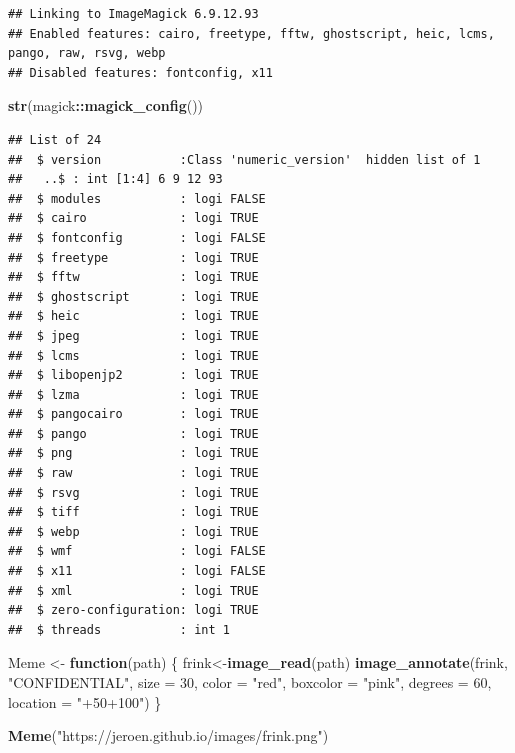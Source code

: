 \documentclass[
]{article}
\newenvironment{Shaded}{\begin{snugshade}}{\end{snugshade}}
\newcommand{\AttributeTok}[1]{\textcolor[rgb]{0.13,0.29,0.53}{#1}}
\newcommand{\ControlFlowTok}[1]{\textcolor[rgb]{0.13,0.29,0.53}{\textbf{#1}}}
\newcommand{\DecValTok}[1]{\textcolor[rgb]{0.00,0.00,0.81}{#1}}
\newcommand{\FunctionTok}[1]{\textcolor[rgb]{0.13,0.29,0.53}{\textbf{#1}}}
\newcommand{\NormalTok}[1]{#1}
\newcommand{\OtherTok}[1]{\textcolor[rgb]{0.56,0.35,0.01}{#1}}
\newcommand{\SpecialCharTok}[1]{\textcolor[rgb]{0.81,0.36,0.00}{\textbf{#1}}}
\newcommand{\StringTok}[1]{\textcolor[rgb]{0.31,0.60,0.02}{#1}}
\begin{document}
\begin{verbatim}
## Linking to ImageMagick 6.9.12.93
## Enabled features: cairo, freetype, fftw, ghostscript, heic, lcms, pango, raw, rsvg, webp
## Disabled features: fontconfig, x11
\end{verbatim}

\begin{Shaded}
\begin{Highlighting}[]
\FunctionTok{str}\NormalTok{(magick}\SpecialCharTok{::}\FunctionTok{magick\_config}\NormalTok{())}
\end{Highlighting}
\end{Shaded}

\begin{verbatim}
## List of 24
##  $ version           :Class 'numeric_version'  hidden list of 1
##   ..$ : int [1:4] 6 9 12 93
##  $ modules           : logi FALSE
##  $ cairo             : logi TRUE
##  $ fontconfig        : logi FALSE
##  $ freetype          : logi TRUE
##  $ fftw              : logi TRUE
##  $ ghostscript       : logi TRUE
##  $ heic              : logi TRUE
##  $ jpeg              : logi TRUE
##  $ lcms              : logi TRUE
##  $ libopenjp2        : logi TRUE
##  $ lzma              : logi TRUE
##  $ pangocairo        : logi TRUE
##  $ pango             : logi TRUE
##  $ png               : logi TRUE
##  $ raw               : logi TRUE
##  $ rsvg              : logi TRUE
##  $ tiff              : logi TRUE
##  $ webp              : logi TRUE
##  $ wmf               : logi FALSE
##  $ x11               : logi FALSE
##  $ xml               : logi TRUE
##  $ zero-configuration: logi TRUE
##  $ threads           : int 1
\end{verbatim}

\begin{Shaded}
\begin{Highlighting}[]
\NormalTok{Meme }\OtherTok{\textless{}{-}} \ControlFlowTok{function}\NormalTok{(path) \{}
\NormalTok{  frink}\OtherTok{\textless{}{-}}\FunctionTok{image\_read}\NormalTok{(path)}
\FunctionTok{image\_annotate}\NormalTok{(frink, }\StringTok{"CONFIDENTIAL"}\NormalTok{, }\AttributeTok{size =} \DecValTok{30}\NormalTok{, }\AttributeTok{color =} \StringTok{"red"}\NormalTok{, }\AttributeTok{boxcolor =} \StringTok{"pink"}\NormalTok{,}
  \AttributeTok{degrees =} \DecValTok{60}\NormalTok{, }\AttributeTok{location =} \StringTok{"+50+100"}\NormalTok{)}
\NormalTok{\}}

\FunctionTok{Meme}\NormalTok{(}\StringTok{"https://jeroen.github.io/images/frink.png"}\NormalTok{)}
\end{Highlighting}
\end{Shaded}
\end{document}
